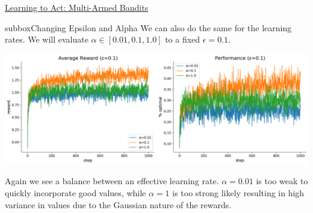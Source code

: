 \begin{textbox}{\href{https://compneuro.neuromatch.io/tutorials/W3D4_ReinforcementLearning/student/W3D4_Tutorial2.html}{Learning to Act: Multi-Armed Bandits } }
\begin{subbox}{subbox}{Changing Epsilon and Alpha}
We can also do the same for the learning rates. We will evaluate $\alpha \in [0.01, 0.1, 1.0]$ to a fixed $\epsilon=0.1$.

\begin{center}
    
\includegraphics[scale=0.15]{Figures/RL/RL_Figure13.png}
\end{center}
Again we see a balance between an effective learning rate. $\alpha=0.01$ is too weak to quickly incorporate good values, while $\alpha=1$ is too strong likely resulting in high variance in values due to the Gaussian nature of the rewards.

\end{subbox}
\end{textbox}
\newpage
